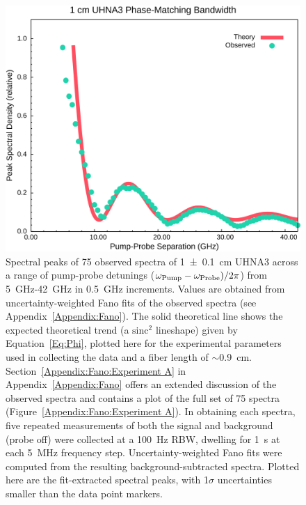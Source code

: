 \begin{figure}[t!]
  \centering
  \hspace{-2em}\includegraphics[width=.85\textwidth]{figs/3-CoBS/Phase-Match.png}
  \caption[Spectral peaks of 75 observed spectra of \SI{1(0.1)}{\centi\meter} \ac{UHNA3} across a range of pump-probe detunings.]{Spectral peaks of 75 observed spectra of \SI{1(0.1)}{\centi\meter} \ac{UHNA3} across a range of pump-probe detunings (\(\omega_{\rm Pump} - \omega_{\rm Probe})/2\pi\)) from \SI{5}{\giga\hertz}-\SI{42}{\giga\hertz} in \SI{0.5}{\giga\hertz} increments. Values are obtained from uncertainty-weighted Fano fits of the observed spectra (see Appendix~\ref{Appendix:Fano}). The solid theoretical line shows the expected theoretical trend (a \(\mathrm{sinc^{2}}\) lineshape) given by Equation~\ref{Eq:Phi}, plotted here for the experimental parameters used in collecting the data and a fiber length of \(\sim\)\SI{0.9}{\centi\meter}. Section~\ref{Appendix:Fano:Experiment A} in Appendix~\ref{Appendix:Fano} offers an extended discussion of the observed spectra and contains a plot of the full set of 75 spectra (Figure~\ref{Appendix:Fano:Experiment A}). In obtaining each spectra, five repeated measurements of both the signal and background (probe off) were collected at a \SI{100}{\hertz} \ac{RBW}, dwelling for \SI{1}{\second} at each \SI{5}{\mega\hertz} frequency step. Uncertainty-weighted Fano fits were computed from the resulting background-subtracted spectra. Plotted here are the fit-extracted spectral peaks, with 1\(\sigma\) uncertainties smaller than the data point markers.}
  \label{fig:Phase-Match}
\end{figure}

